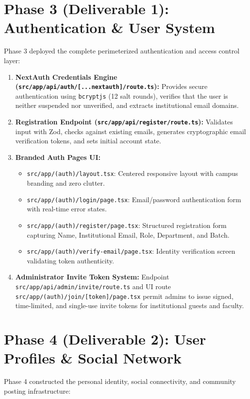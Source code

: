 \documentclass[12pt, a4paper, oneside]{report}
\begin{document}
\section{Phase 3 (Deliverable 1): Authentication \& User System}
Phase 3 deployed the complete perimeterized authentication and access control layer:
\begin{enumerate}[leftmargin=0.7cm]
    \item \textbf{NextAuth Credentials Engine (\texttt{src/app/api/auth/[...nextauth]/route.ts}):} Provides secure authentication using \texttt{bcryptjs} (12 salt rounds), verifies that the user is neither suspended nor unverified, and extracts institutional email domains.
    \item \textbf{Registration Endpoint (\texttt{src/app/api/register/route.ts}):} Validates input with Zod, checks against existing emails, generates cryptographic email verification tokens, and sets initial account state.
    \item \textbf{Branded Auth Pages UI:}
    \begin{itemize}
        \item \texttt{src/app/(auth)/layout.tsx}: Centered responsive layout with campus branding and zero clutter.
        \item \texttt{src/app/(auth)/login/page.tsx}: Email/password authentication form with real-time error states.
        \item \texttt{src/app/(auth)/register/page.tsx}: Structured registration form capturing Name, Institutional Email, Role, Department, and Batch.
        \item \texttt{src/app/(auth)/verify-email/page.tsx}: Identity verification screen validating token authenticity.
    \end{itemize}
    \item \textbf{Administrator Invite Token System:} Endpoint \texttt{src/app/api/admin/invite/route.ts} and UI route \texttt{src/app/(auth)/join/[token]/page.tsx} permit admins to issue signed, time-limited, and single-use invite tokens for institutional guests and faculty.
\end{enumerate}

\section{Phase 4 (Deliverable 2): User Profiles \& Social Network}
Phase 4 constructed the personal identity, social connectivity, and community posting infrastructure:
\end{document}
